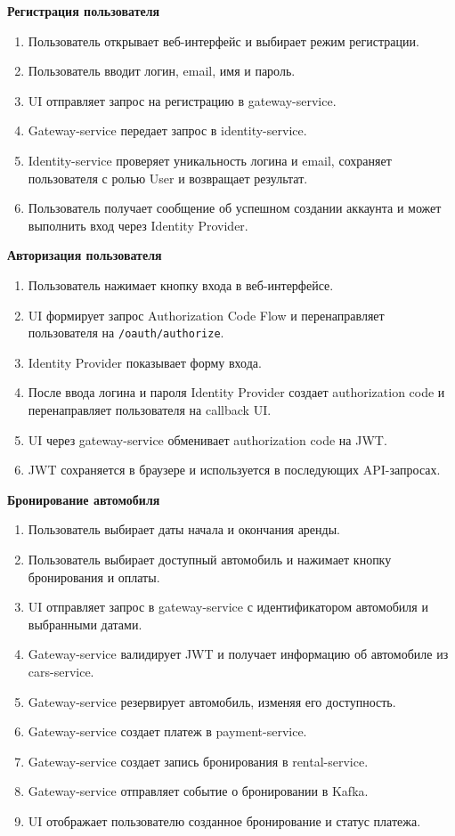 \textbf{Регистрация пользователя}
\begin{enumerate}
	\item Пользователь открывает веб-интерфейс и выбирает режим регистрации.
	\item Пользователь вводит логин, email, имя и пароль.
	\item UI отправляет запрос на регистрацию в gateway-service.
	\item Gateway-service передает запрос в identity-service.
	\item Identity-service проверяет уникальность логина и email, сохраняет пользователя с ролью User и возвращает результат.
	\item Пользователь получает сообщение об успешном создании аккаунта и может выполнить вход через Identity Provider.
\end{enumerate}

\textbf{Авторизация пользователя}
\begin{enumerate}
	\item Пользователь нажимает кнопку входа в веб-интерфейсе.
	\item UI формирует запрос Authorization Code Flow и перенаправляет пользователя на \texttt{/oauth/authorize}.
	\item Identity Provider показывает форму входа.
	\item После ввода логина и пароля Identity Provider создает authorization code и перенаправляет пользователя на callback UI.
	\item UI через gateway-service обменивает authorization code на JWT.
	\item JWT сохраняется в браузере и используется в последующих API-запросах.
\end{enumerate}

\textbf{Бронирование автомобиля}
\begin{enumerate}
	\item Пользователь выбирает даты начала и окончания аренды.
	\item Пользователь выбирает доступный автомобиль и нажимает кнопку бронирования и оплаты.
	\item UI отправляет запрос в gateway-service с идентификатором автомобиля и выбранными датами.
	\item Gateway-service валидирует JWT и получает информацию об автомобиле из cars-service.
	\item Gateway-service резервирует автомобиль, изменяя его доступность.
	\item Gateway-service создает платеж в payment-service.
	\item Gateway-service создает запись бронирования в rental-service.
	\item Gateway-service отправляет событие о бронировании в Kafka.
	\item UI отображает пользователю созданное бронирование и статус платежа.
\end{enumerate}

